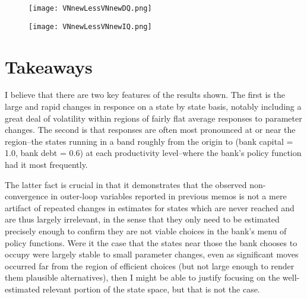 \documentclass[english]{article}
\begin{document}
\begin{figure}[H]
\centering
		\texttt{[image: VNnewLessVNnewDQ.png]}
\end{figure}
\begin{figure}[H]
\centering
		\texttt{[image: VNnewLessVNnewIQ.png]}
\end{figure}


\section{Takeaways}
I believe that there are two key features of the results shown. The first is the large and rapid changes in responce 
on a state by state basis, notably including a great deal of volatility within regions of fairly flat average responses 
to parameter changes. The second is that responses are often most pronounced at or near the region--the 
states running in a band roughly from the origin to (bank capital = 1.0, bank debt = 0.6) at each productivity 
level--where the bank's policy function had it most frequently.

The latter fact is crucial in that it demonstrates that the observed non-convergence in outer-loop 
variables reported in previous memos is not a mere artifact of repeated changes in estimates for states 
which are never reached and are thus largely irrelevant, in the sense that they only need to be estimated 
precisely enough to confirm they are not viable choices in the bank's menu of policy functions. Were it 
the case that the states near those the bank chooses to occupy were largely stable to small parameter 
changes, even as significant moves occurred far from the region of efficient choices (but not large enough 
to render them plausible alternatives), then I might be able to justify focusing on the well-estimated relevant 
portion of the state space, but that is not the case.
\end{document}
